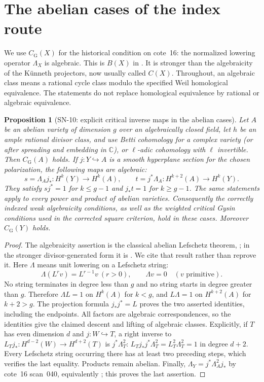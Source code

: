 \documentclass[11pt,a4paper]{article}
\newtheorem{proposition}[theorem]{Proposition}
\theoremstyle{definition}
\theoremstyle{remark}
\begin{document}
\section{The abelian cases of the index route}
\label{sec:abelian}

We use $C_{\mathrm G}(X)$ for the historical condition on cote~16:
the normalized lowering operator $\Lambda_X$ is algebraic.  This is
$B(X)$ in \cite[\S2]{Kleiman1968}.  It is stronger than the algebraicity
of the K\"unneth projectors, now usually called $C(X)$.
Throughout, an algebraic class means a rational cycle class modulo the
specified Weil homological equivalence.  The statements do not replace
homological equivalence by rational or algebraic equivalence.

\begin{proposition}[SN-10: explicit critical inverse maps in the abelian cases]
Let $A$ be an abelian variety of dimension $g$ over an algebraically closed
field, let $h$ be an ample rational divisor class, and use Betti cohomology
for a complex variety (or after spreading and embedding in $\mathbb C$),
or $\ell$-adic cohomology with $\ell$ invertible.
Then $C_{\mathrm G}(A)$ holds.  If $j:Y\hookrightarrow A$ is a smooth
hyperplane section for the chosen polarization, the following maps are
algebraic:
\[
 s=\Lambda_A j_*:H^k(Y)\longrightarrow H^k(A),\qquad
 t=j^*\Lambda_A:H^{k+2}(A)\longrightarrow H^k(Y).
\]
They satisfy $sj^*=1$ for $k\leq g-1$ and $j_*t=1$ for $k\geq g-1$.
The same statements apply to every power and product of abelian varieties.
Consequently the correctly indexed weak algebraicity conditions, as well
as the weighted critical Gysin conditions used in the corrected square
criterion, hold in these cases.  Moreover $C_{\mathrm G}(Y)$ holds.
\end{proposition}
\begin{proof}
The algebraicity assertion is the classical abelian Lefschetz theorem,
\cite[Theorem~2A11]{Kleiman1968}; in the stronger divisor-generated form it
is \cite[Theorem~5.9, with the author's correction to its proof]{Milne1999a}.
We cite that result rather than reprove it.  Here $\Lambda$ means unit
lowering on a Lefschetz string:
\[
 \Lambda(L^r v)=L^{r-1}v\ (r>0),\qquad \Lambda v=0
 \quad(v\text{ primitive}).
\]
No string terminates in degree less than $g$ and no string starts in degree
greater than $g$.  Therefore $\Lambda L=1$ on $H^k(A)$ for $k<g$, and
$L\Lambda=1$ on $H^{k+2}(A)$ for $k+2>g$.  The projection formula
$j_*j^*=L$ proves the two asserted identities, including the endpoints.
All factors are algebraic correspondences, so the identities give the
claimed descent and lifting of algebraic classes.  Explicitly, if $T$ has
even dimension $d$ and $j:W\hookrightarrow T$, a right inverse to
$L_Tj_*:H^{d-2}(W)\to H^{d+2}(T)$ is $j^*\Lambda_T^2$:
$L_Tj_*j^*\Lambda_T^2=L_T^2\Lambda_T^2=1$ in degree $d+2$.
Every Lefschetz string occurring there has at least two preceding steps,
which verifies the last equality.  Products remain abelian.  Finally,
$\Lambda_Y=j^*\Lambda_A^2j_*$ by cote~16 scan~040, equivalently
\cite[Proposition~2.12]{Kleiman1968}; this proves the last assertion.
\end{proof}
\end{document}
